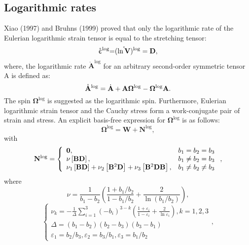 \subsection{Logarithmic rates}
\noindent
Xiao (1997) \cite{xiao1997logarithmic} and Bruhns (1999) \cite{Bruhns1999479} proved that only the logarithmic rate of the Eulerian logarithmic strain tensor is equal to the stretching tensor:
\begin{equation}
{\mathring {\mathbf{\upepsilon }}^{\log }}{\rm{ = }}{( {\mathring {\ln \mathbf{V}}} )^{\log }} = {\mathbf{D}},
\end{equation}
where, the logarithmic rate ${\mathring {\mathbf{A}}^{\log }}$ for an arbitrary second-order symmetric tensor A is defined as:
\begin{equation}
{\mathring {\mathbf{A}}^{\log }} = {\dot {\bf{A}}} + {\mathbf{A}}{{\mathbf{\Omega }}^{\log }} - {{\mathbf{\Omega }}^{\log }}{\mathbf{A}}.
\end{equation}
The spin ${{\mathbf{\Omega }}^{\log }}$ is suggested as the logarithmic spin.
Furthermore, Eulerian logarithmic strain tensor and the Cauchy stress form a work-conjugate pair of strain and stress.
An explicit basis-free expression for ${{\mathbf{\Omega }}^{\log }}$ is as follows:
\begin{equation}
{{\bm{\Omega }}^{\log }} = {\mathbf{W}} + {{\mathbf{N}}^{\log }},
\end{equation}
with
\begin{equation}
{{\bf{N}}^{\log }} = \left\{ {\begin{array}{*{20}{l}}
{{\bf{0}},}&{{b_1} = {b_2} = {b_3}}\\
{\nu \left[ {{\bf{BD}}} \right],}&{{b_1} \ne {b_2} = {b_3}}\\
{{\nu _1}\left[ {{\bf{BD}}} \right] + {\nu _2}\left[ {{{\bf{B}}^2}{\bf{D}}} \right] + {\nu _3}\left[ {{{\bf{B}}^2}{\bf{DB}}} \right],}&{{b_1} \ne {b_2} \ne {b_3}}
\end{array}} \right.
,
\end{equation}
where
\begin{equation}
\nu  = \frac{1}{{{b_1} - {b_2}}}\left( {\frac{{1 + {b_1}/{b_2}}}{{1 - {b_1}/{b_2}}} + \frac{2}{{\ln \left( {{b_1}/{b_2}} \right)}}} \right),
\end{equation}
\begin{equation}
\left\{ {\begin{array}{*{20}{l}}
{{\nu _k} =  - \frac{1}{\Delta }\sum\limits_{i = 1}^3 {{{\left( { - {b_i}} \right)}^{3 - k}}\left( {\frac{{1 + {\varepsilon _i}}}{{1 - {\varepsilon _i}}} + \frac{2}{{\ln {\varepsilon _i}}}} \right)} ,k = 1,2,3}\\
{\Delta  = \left( {{b_1} - {b_2}} \right)\left( {{b_2} - {b_3}} \right)\left( {{b_3} - {b_1}} \right)}\\
{{\varepsilon _1} = {b_2}/{b_3},{\varepsilon _2} = {b_3}/{b_1},{\varepsilon _3} = {b_1}/{b_2}}
\end{array}} \right.
,
\end{equation}
